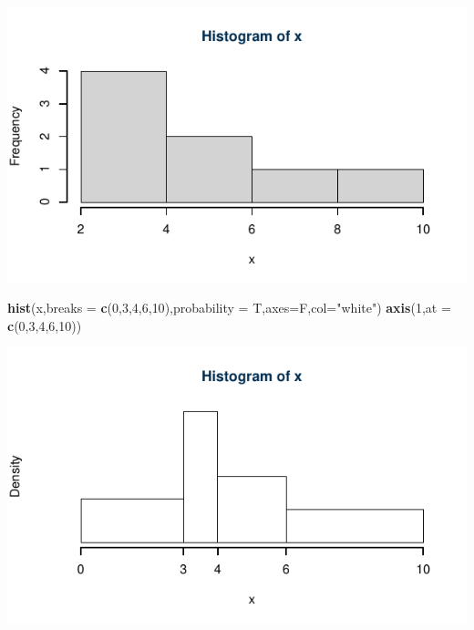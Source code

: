 \documentclass[
  11pt,
]{book}
\newenvironment{Shaded}{\begin{snugshade}}{\end{snugshade}}
\newcommand{\AttributeTok}[1]{\textcolor[rgb]{0.13,0.29,0.53}{#1}}
\newcommand{\DecValTok}[1]{\textcolor[rgb]{0.00,0.00,0.81}{#1}}
\newcommand{\FunctionTok}[1]{\textcolor[rgb]{0.13,0.29,0.53}{\textbf{#1}}}
\newcommand{\NormalTok}[1]{#1}
\newcommand{\StringTok}[1]{\textcolor[rgb]{0.31,0.60,0.02}{#1}}
\theoremstyle{mytheoremstyle}
\theoremstyle{mydefstyle}
\begin{document}
\begin{center}\includegraphics{Appunti_di_Statistica_2025_files/figure-latex/24-Libro-27-1} \end{center}

\begin{Shaded}
\begin{Highlighting}[]
\FunctionTok{hist}\NormalTok{(x,}\AttributeTok{breaks =} \FunctionTok{c}\NormalTok{(}\DecValTok{0}\NormalTok{,}\DecValTok{3}\NormalTok{,}\DecValTok{4}\NormalTok{,}\DecValTok{6}\NormalTok{,}\DecValTok{10}\NormalTok{),}\AttributeTok{probability =}\NormalTok{ T,}\AttributeTok{axes=}\NormalTok{F,}\AttributeTok{col=}\StringTok{"white"}\NormalTok{)}
\FunctionTok{axis}\NormalTok{(}\DecValTok{1}\NormalTok{,}\AttributeTok{at =} \FunctionTok{c}\NormalTok{(}\DecValTok{0}\NormalTok{,}\DecValTok{3}\NormalTok{,}\DecValTok{4}\NormalTok{,}\DecValTok{6}\NormalTok{,}\DecValTok{10}\NormalTok{))}
\end{Highlighting}
\end{Shaded}

\begin{center}\includegraphics{Appunti_di_Statistica_2025_files/figure-latex/24-Libro-27-2} \end{center}
\end{document}
